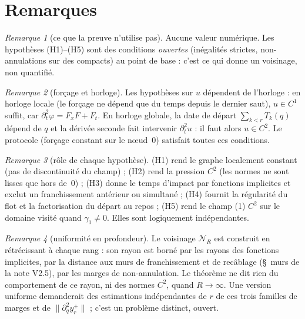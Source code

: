 \documentclass[11pt,a4paper]{article}
\theoremstyle{remark}
\newtheorem{remarque}{Remarque}
\newcommand{\norm}[1]{\lVert #1\rVert}
\begin{document}
\section{Remarques}
\begin{remarque}[ce que la preuve n'utilise pas]\label{rem:nonum}
Aucune valeur num\'erique. Les hypoth\`eses (H1)--(H5) sont des conditions \emph{ouvertes} (in\'egalit\'es strictes, non-annulations sur des compacts) au point de base : c'est ce qui donne un voisinage, non quantifi\'e.
\end{remarque}
\begin{remarque}[for\c{c}age et horloge]\label{rem:horloge}
Les hypoth\`eses sur $u$ d\'ependent de l'horloge : en horloge locale (le for\c{c}age ne d\'epend que du temps depuis le dernier saut), $u\in C^1$ suffit, car $\partial_t^2\varphi=F_xF+F_t$. En horloge globale, la date de d\'epart $\sum_{k<r}T_k(q)$ d\'epend de $q$ et la d\'eriv\'ee seconde fait intervenir $\partial_t^2u$ : il faut alors $u\in C^2$. Le protocole (for\c{c}age constant sur le n\oe ud~0) satisfait toutes ces conditions.
\end{remarque}
\begin{remarque}[r\^ole de chaque hypoth\`ese]
(H1) rend le graphe localement constant (pas de discontinuit\'e du champ) ; (H2) rend la pression $C^2$ (les normes ne sont lisses que hors de~$0$) ; (H3) donne le temps d'impact par fonctions implicites et exclut un franchissement ant\'erieur ou simultan\'e ; (H4) fournit la r\'egularit\'e du flot et la factorisation du d\'epart au repos ; (H5) rend le champ (1) $C^2$ sur le domaine visit\'e quand $\gamma_1\neq0$. Elles sont logiquement ind\'ependantes.
\end{remarque}
\begin{remarque}[uniformit\'e en profondeur]\label{rem:unif}
Le voisinage $\mathcal N_R$ est construit en r\'etr\'ecissant \`a chaque rang : son rayon est born\'e par les rayons des fonctions implicites, par la distance aux murs de franchissement et de recâblage (\S~murs de la note V2.5), par les marges de non-annulation. Le th\'eor\`eme ne dit rien du comportement de ce rayon, ni des normes $C^2$, quand $R\to\infty$. Une version uniforme demanderait des estimations ind\'ependantes de $r$ de ces trois familles de marges et de $\norm{\partial_q^2y_r^+}$ ; c'est un probl\`eme distinct, ouvert.
\end{remarque}
\end{document}
